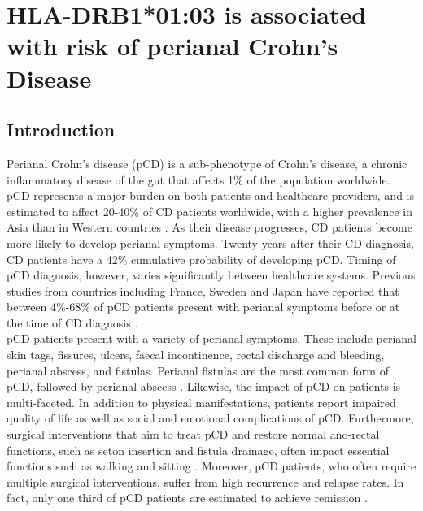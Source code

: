 
\chapter{HLA-DRB1*01:03 is associated with risk of perianal Crohn's Disease}

\ifpdf
    \graphicspath{{Chapter4/Figs/Raster/}{Chapter4/Figs/PDF/}{Chapter4/Figs/}}
\else
    \graphicspath{{Chapter4/Figs/Vector/}{Chapter4/Figs/}}
\fi
\section{Introduction}
Perianal Crohn's disease (pCD) is a sub-phenotype of Crohn's disease, a chronic inflammatory disease of the gut that affects 1\% of the population worldwide. pCD represents a major burden on both patients and healthcare providers, and is estimated to affect 20-40\% of CD patients worldwide, with a higher prevalence in Asia than in Western countries \cite{Ng2016-al}. As their disease progresses, CD patients become more likely to develop perianal symptoms. Twenty years after their CD diagnosis, CD patients have a 42\% cumulative probability of developing pCD. Timing of pCD diagnosis, however, varies significantly between healthcare systems. Previous studies from countries including France, Sweden and Japan have reported that between 4\%-68\% of pCD patients present with perianal symptoms before or at the time of CD diagnosis \cite{Mizushima2021-hk,Pogacnik2019-aj,Wils2021-ao}.\\

pCD patients present with a variety of perianal symptoms. These include perianal skin tags, fissures, ulcers, faecal incontinence, rectal discharge and bleeding, perianal abscess, and fistulas. Perianal fistulas are the most common form of pCD, followed by perianal abscess \cite{Eglinton2012-vx}. Likewise, the impact of pCD on patients is multi-faceted. In addition to physical manifestations, patients report impaired quality of life as well as social and emotional complications of pCD. Furthermore, surgical interventions that aim to treat pCD and restore normal ano-rectal functions, such as seton insertion and fistula drainage, often impact essential functions such as walking and sitting \cite{Adegbola2020-nd}. Moreover, pCD patients, who often require multiple surgical interventions, suffer from high recurrence and relapse rates. In fact, only one third of pCD patients are estimated to achieve remission \cite{Panes2018-su,Braithwaite2017-zo}. \\

